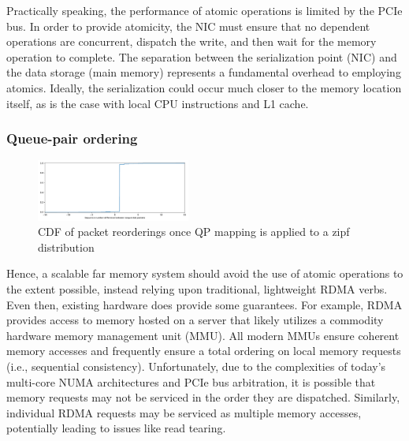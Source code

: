 Practically speaking, the performance of atomic operations is limited
by the PCIe bus.  In order to provide atomicity, the NIC must ensure
that no dependent operations are concurrent, dispatch the write, and
then wait for the memory operation to complete.  The separation
between the serialization point (NIC) and the data storage (main
memory) represents a fundamental overhead to employing atomics.
Ideally, the serialization could occur much closer to the memory
location itself, as is the case with local CPU instructions and L1
cache.




\subsubsection{Queue-pair ordering}

\begin{figure}[t]
    \includegraphics[width=0.45\textwidth]{fig/qp_reordering.pdf}
    \caption{CDF of packet reorderings once QP mapping is applied to a zipf distribution}
    \label{fig:reorder}
\end{figure}

Hence, a scalable far memory system should avoid the use of atomic
operations to the extent possible, instead relying upon traditional,
lightweight RDMA verbs.  Even then, existing hardware does provide
some guarantees.  For example, RDMA provides access to memory hosted
on a server that likely utilizes a commodity hardware memory
management unit (MMU).  All modern MMUs ensure coherent memory
accesses and frequently ensure a total ordering on local memory
requests (i.e., sequential consistency).  Unfortunately, due to the
complexities of today's multi-core NUMA architectures and PCIe bus
arbitration, it is possible that memory requests may not be serviced
in the order they are dispatched.  Similarly, individual RDMA requests
may be serviced as multiple memory accesses, potentially leading to
issues like read tearing.


